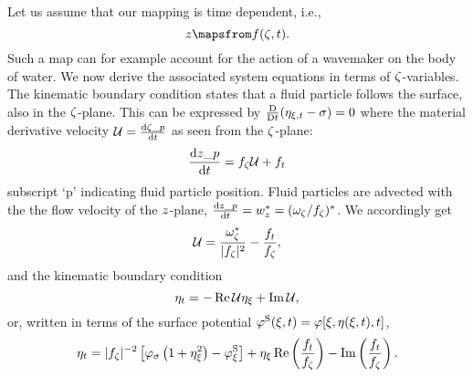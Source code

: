 Let us assume that our mapping is time dependent, i.e.,
\begin{equation}
z \mapsfrom f(\zz,t).
\label{eq:}
\end{equation}
Such a map can for example account for the action of a wavemaker on the body of water.
We now derive the associated system equations in terms of $\zeta$-variables.
The kinematic boundary condition states that a fluid particle follows the surface, also in the $\zeta$-plane.
This can be expressed by $\frac{\mathrm D}{\mathrm Dt}(\eta_{\xi,t}-\sigma)=0$ where
the material derivative velocity $\mathcal U=\frac{\mathrm d \zeta\_p}{\mathrm d t}$ as seen from the $\zeta$-plane:
\[
\frac{\mathrm d z\_p}{\mathrm d t} = f_\zeta \mathcal U + f_t
\]
subscript `p' indicating fluid particle position.
Fluid particles are advected with the the flow velocity of the $z$-plane, $\frac{\mathrm d z\_p}{\mathrm d t}=w_z^*=(\omega_\zeta/f_\zeta)^*$.
We accordingly get
\begin{equation}
\mathcal U = \frac{\omega_\zeta^*}{|f_\zeta|^2}-\frac{f_t}{f_\zeta},
\label{eq:UU}
\end{equation}
and the kinematic boundary condition
\begin{equation}
\eta_t = - \operatorname{Re} \mathcal U \eta_\xi + \operatorname{Im} \mathcal U,
\label{eq:BC_kin_transientU}
\end{equation}
or, written in terms of the surface potential $\varphi^\mathrm{S}(\xi,t)=\varphi[\xi,\eta(\xi,t),t]$,
\begin{equation}
\eta_t = |f_\zeta|^{-2}\left[\varphi_\sigma\left(1+\eta_\xi^2\right)-\varphi^\mathrm{S}_\xi\right] + \eta_\xi \operatorname{Re}\left(\frac{f_t}{f_\zeta}\right)-\operatorname{Im}\left(\frac{f_t}{f_\zeta}\right).
\label{eq:BC_kin_transient}
\end{equation}
%
\\

